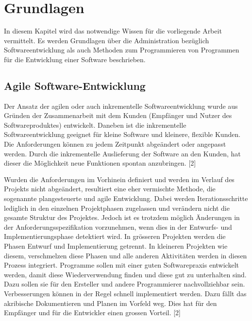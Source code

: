 
\section{Grundlagen}
In diesem Kapitel wird das notwendige Wissen für die vorliegende Arbeit vermittelt. Es werden Grundlagen über die Administration bezüglich Softwareentwicklung als auch Methoden zum Programmieren von Programmen für die Entwicklung einer Software beschrieben.\\

\subsection{Agile Software-Entwicklung}
Der Ansatz der agilen oder auch inkrementelle Softwareentwicklung wurde aus Gründen der Zusammenarbeit mit dem Kunden (Empfänger und Nutzer des Softwareproduktes) entwickelt. Daneben ist die inkrementelle Softwareentwicklung geeignet für kleine Software und kleinere, flexible Kunden. Die Anforderungen können zu jedem Zeitpunkt abgeändert oder angepasst werden. Durch die inkrementelle Auslieferung der Software an den Kunden, hat dieser die Möglichkeit neue Funktionen spontan anzubringen. [2]

Wurden die Anforderungen im Vorhinein definiert und werden im Verlauf des Projekts nicht abgeändert, resultiert eine eher vermischte Methode, die sogenannte plangesteuerte und agile Entwicklung. Dabei werden Iterationsschritte lediglich in den einzelnen Projektphasen zugelassen und verändern nicht die gesamte Struktur des Projektes. Jedoch ist es trotzdem möglich Änderungen in der Anforderungsspezifikation vorzunehmen, wenn dies in der Entwurfs- und Implementierungsphase detektiert wird. In grösseren Projekten werden die Phasen Entwurf und Implementierung getrennt. In kleineren Projekten wie diesem, verschmelzen diese Phasen und alle anderen Aktivitäten werden in diesen Prozess integriert. Programme sollen mit einer guten Softwarepraxis entwickelt werden, damit diese Wiederverwendung finden und diese gut zu unterhalten sind. Dazu sollen sie für den Ersteller und andere Programmierer nachvollziehbar sein.
Verbesserungen können in der Regel schnell implementiert werden. Dazu fällt das akribische Dokumentieren und Planen im Vorfeld weg. Dies hat für den Empfänger und für die Entwickler einen grossen Vorteil. [2] %

